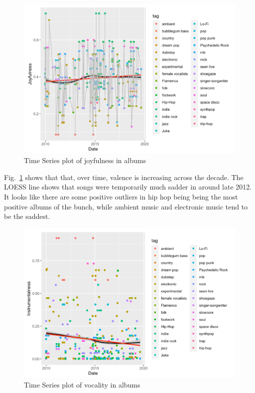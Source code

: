 \documentclass[conference]{IEEEtran}
\begin{document}
\begin{figure}[htbp]
\centerline{\includegraphics[width = \columnwidth]{spotify-images/joy_ts_album}}
\caption{Time Series plot of joyfulness in albums}
\label{fig:ts_album}
\end{figure}

Fig.~\ref{fig:ts_album} shows that that, over time, valence is increasing across the decade. The LOESS line shows that songs were temporarily much sadder in around late 2012. It looks like there are some positive outliers in hip hop being being the most positive albums of the bunch, while ambient music and electronic music tend to be the saddest. 

\begin{figure}[htbp]
\centerline{\includegraphics[width = \columnwidth]{spotify-images/vocal_ts_album}}
\caption{Time Series plot of vocality in albums}
\label{fig:ts_album_v}
\end{figure}
\end{document}
